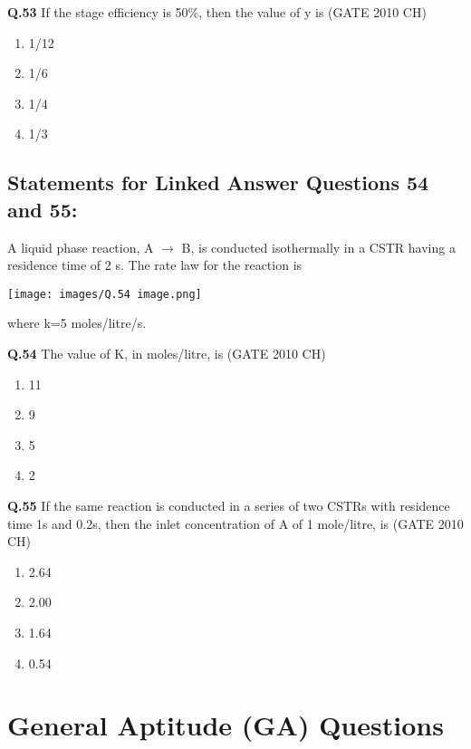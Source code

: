 \documentclass[journal,12pt,onecolumn]{exam}
\theoremstyle{remark}
\begin{document}
\noindent
  \textbf{Q.53}
  If the stage efficiency is 50\%, then the value of y is
  \hfill{(GATE 2010 CH)}\\

\begin{enumerate}
    \item 1/12
    \item 1/6
    \item 1/4
    \item 1/3
\end{enumerate}

\subsection{ Statements for Linked Answer Questions 54 and 55:} 

 A liquid phase reaction, A $\rightarrow $ B, is conducted isothermally in a CSTR having a residence time of 2 s. The rate law for the reaction is  


    \texttt{[image: images/Q.54 image.png]}
   
 where k=5 moles/litre/s.
     
\noindent
\textbf{Q.54}
 The value of K, in moles/litre, is
\hfill{(GATE 2010 CH)}\\

\begin{enumerate}
    \item 11
    \item 9
    \item 5
    \item 2
    
\end{enumerate}

\noindent
\textbf{Q.55}
 If the same reaction is conducted in a series of two CSTRs with residence time 1s and 0.2s, then the inlet concentration of A of 1 mole/litre, is
\hfill{(GATE 2010 CH)}\\

 \begin{enumerate}
     \item 2.64
     \item 2.00
     \item 1.64
     \item 0.54
     
 \end{enumerate}

\section{General Aptitude (GA) Questions}
\end{document}
